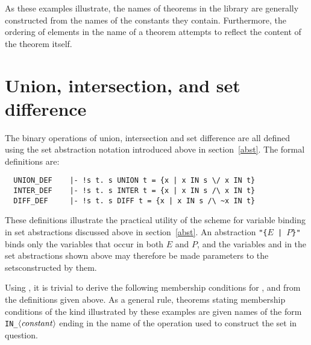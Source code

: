 \noindent As these examples
illustrate, the names of theorems in the  library are generally
constructed from the names of the constants they contain.  Furthermore, the
ordering of elements in the name of a theorem attempts to reflect the content
of the theorem itself.

\section{Union, intersection, and set difference}

The binary operations of union, intersection and set difference are all defined
using the set abstraction notation introduced above in section~\ref{abst}.  The
formal definitions are:

\begin{hol}
\begin{verbatim}
  UNION_DEF    |- !s t. s UNION t = {x | x IN s \/ x IN t}
  INTER_DEF    |- !s t. s INTER t = {x | x IN s /\ x IN t}
  DIFF_DEF     |- !s t. s DIFF t = {x | x IN s /\ ~x IN t}
\end{verbatim}\end{hol}

\noindent These definitions illustrate the practical utility of the scheme for
variable binding in set abstractions discussed above in section~\ref{abst}.  An
abstraction {\small\verb!"{!$E$\verb! | !$P$\verb!}"!} binds only the variables
that occur in both {\small $E$} and {\small $P$}, and the variables  and
 in the set abstractions shown above may therefore be made parameters to
the sets\pagebreak[3] constructed by them.

Using , it is trivial to derive the following membership
conditions for ,  and  from the definitions given
above. As a general rule,
theorems stating membership conditions of the kind illustrated by these
examples are given names of the form {\small\verb!IN_!$\langle\hbox{\it
constant\/}\rangle$} ending in the name of the operation used to construct the
set in question.

